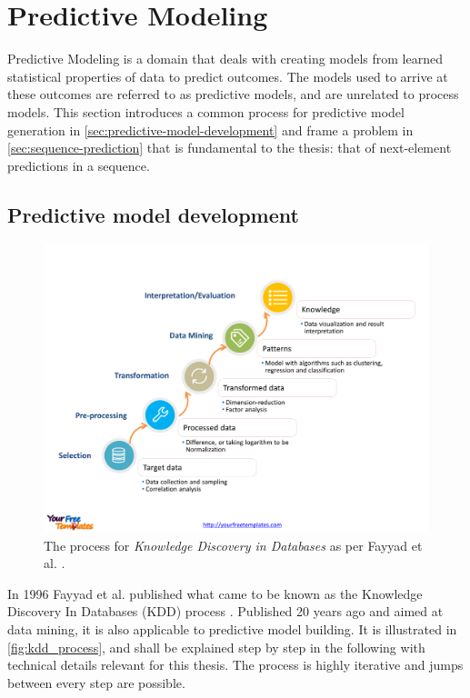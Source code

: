 \section{Predictive Modeling}
\label{sec:predictive-modeling}
Predictive Modeling is a domain that deals with creating models from learned statistical properties of data to predict outcomes. The models used to arrive at these outcomes are referred to as predictive models, and are unrelated to process models. This section introduces a common process for predictive model generation in \autoref{sec:predictive-model-development} and frame a problem in \autoref{sec:sequence-prediction} that is fundamental to the thesis: that of next-element predictions in a sequence.

\subsection{Predictive model development}
\label{sec:predictive-model-development} 
\begin{figure}
	\centering
	\includegraphics[width=\textwidth]{gfx/kdd_process.png}
	\caption{The process for \textit{Knowledge Discovery in Databases} as per Fayyad et al. \cite{fayyad1996data}.}
	\label{fig:kdd_process}
\end{figure}

In 1996 Fayyad et al. published what came to be known as the Knowledge Discovery In Databases (KDD) process \cite{fayyad1996data}. Published 20 years ago and aimed at data mining, it is also applicable to predictive model building. It is illustrated in \autoref{fig:kdd_process}, and shall be explained step by step in the following with technical details relevant for this thesis. The process is highly iterative and jumps between every step are possible.

